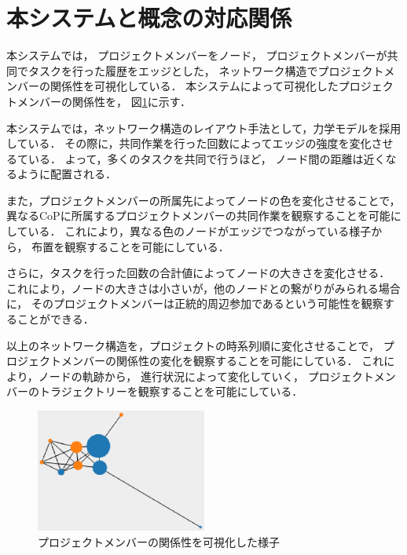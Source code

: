 \documentclass[submit,techrep]{ipsj}
\begin{document}
\section{本システムと概念の対応関係}
\label{system-map}

本システムでは，
プロジェクトメンバーをノード，
プロジェクトメンバーが共同でタスクを行った履歴をエッジとした，
ネットワーク構造でプロジェクトメンバーの関係性を可視化している．
本システムによって可視化したプロジェクトメンバーの関係性を，
図\ref{cop-map-graph}に示す．

本システムでは，ネットワーク構造のレイアウト手法として，力学モデルを採用している．
その際に，共同作業を行った回数によってエッジの強度を変化させるている．
よって，多くのタスクを共同で行うほど，
ノード間の距離は近くなるように配置される．

また，プロジェクトメンバーの所属先によってノードの色を変化させることで，
異なるCoPに所属するプロジェクトメンバーの共同作業を観察することを可能にしている．
これにより，異なる色のノードがエッジでつながっている様子から，
布置を観察することを可能にしている．

さらに，タスクを行った回数の合計値によってノードの大きさを変化させる．
これにより，ノードの大きさは小さいが，他のノードとの繋がりがみられる場合に，
そのプロジェクトメンバーは正統的周辺参加であるという可能性を観察することができる．

以上のネットワーク構造を，プロジェクトの時系列順に変化させることで，
プロジェクトメンバーの関係性の変化を観察することを可能にしている．
これにより，ノードの軌跡から，
進行状況によって変化していく，
プロジェクトメンバーのトラジェクトリーを観察することを可能にしている．


\begin{figure}[h]
  \centering
  \includegraphics[width=0.5\textwidth]{img/cop-map-graph.eps}
  \caption{プロジェクトメンバーの関係性を可視化した様子}
  \label{cop-map-graph}
\end{figure}
\end{document}
